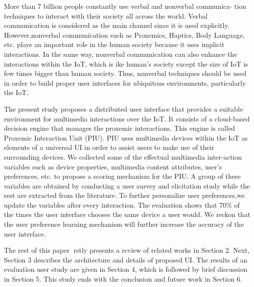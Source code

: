 \documentclass{article}
\begin{document}
More than 7 billion people constantly use verbal and nonverbal communica-
tion techniques to interact with their society all across the world. Verbal communication is considered as the main channel since it is used explicitly. However,nonverbal communication such as Proxemics, Haptics, Body Language, etc. plays an important role in the human society because it uses implicit interactions. In the same way, nonverbal communication can also enhance the interactions within the IoT, which is ike human's society except the size of IoT is few times bigger than human society. Thus, nonverbal techniques should be used in order to build proper user interfaces for ubiquitous environments, particularly the IoT.

The present study proposes a distributed user interface that provides a suitable environment for multimedia interactions over the IoT. It consists of a cloud-based decision engine that manages the proxemic interactions. This engine is called Proxemic Interaction Unit (PIU). PIU uses multimedia devices within the IoT as elements of a universal UI in order to assist users to make use of their surrounding devices. We collected some of the effectual multimedia inter-action variables such as device properties, multimedia content attributes, user's preferences, etc. to propose a scoring mechanism for the PIU. A group of these variables are obtained by conducting a user survey and elicitation study while the rest are extracted from the literature. To further personalize user preferences,we update the variables after every interaction. The evaluation shows that 70\% of the times the user interface chooses the same device a user would. We reckon that the user preference learning mechanism will further increase the accuracy of the user interface.

The rest of this paper rstly presents a review of related works in Section 2. Next, Section 3 describes the architecture and details of proposed UI. The results of an evaluation user study are given in Section 4, which is followed by brief discussion in Section 5. This study ends with the conclusion and future work in Section 6.
\end{document}
